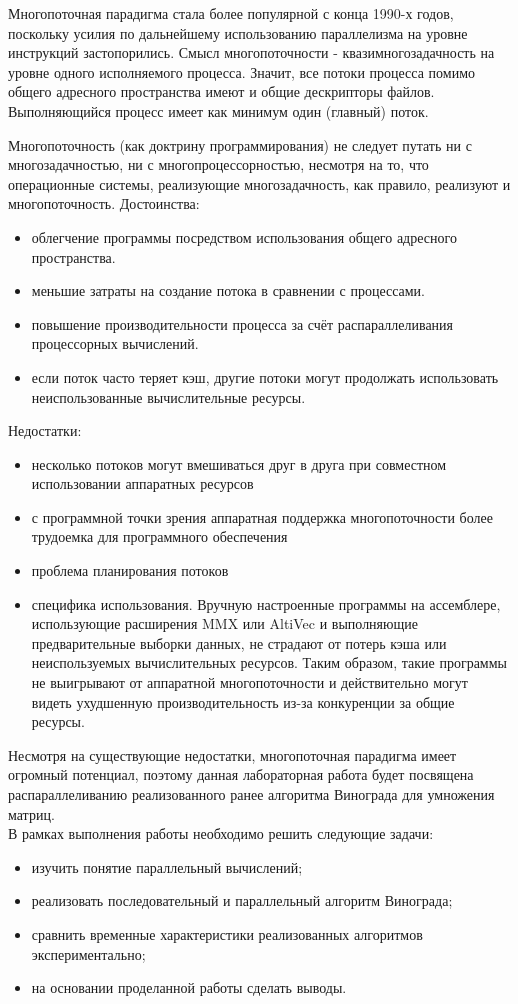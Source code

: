 \documentclass[a4paper,12pt]{article}
\begin{document}
		
Многопоточная парадигма стала более популярной с конца 1990-х годов, поскольку усилия по дальнейшему использованию параллелизма на уровне инструкций застопорились. Смысл многопоточности - квазимногозадачность на уровне одного исполняемого процесса. Значит, все потоки процесса помимо общего адресного пространства имеют и общие дескрипторы файлов. Выполняющийся процесс имеет как минимум один (главный) поток.

Многопоточность (как доктрину программирования) не следует путать ни с многозадачностью, ни с многопроцессорностью, несмотря на то, что операционные системы, реализующие многозадачность, как правило, реализуют и многопоточность.
Достоинства:
\begin{itemize}
    \item облегчение программы посредством использования общего адресного пространства.
    \item меньшие затраты на создание потока в сравнении с процессами.
    \item повышение производительности процесса за счёт распараллеливания процессорных вычислений.
    \item если поток часто теряет кэш, другие потоки могут продолжать использовать неиспользованные вычислительные ресурсы.
\end{itemize}
Недостатки:
\begin{itemize}
    \item несколько потоков могут вмешиваться друг в друга при совместном использовании аппаратных ресурсов
    \item с программной точки зрения аппаратная поддержка многопоточности более трудоемка для программного обеспечения
    \item проблема планирования потоков
    \item специфика использования. Вручную настроенные программы на ассемблере, использующие расширения MMX или AltiVec и выполняющие предварительные выборки данных, не страдают от потерь кэша или неиспользуемых вычислительных ресурсов. Таким образом, такие программы не выигрывают от аппаратной многопоточности и действительно могут видеть ухудшенную производительность из-за конкуренции за общие ресурсы\cite{litlink1}.
\end{itemize}
Несмотря на существующие недостатки, многопоточная парадигма имеет огромный потенциал, поэтому данная лабораторная работа будет посвящена распараллеливанию реализованного ранее алгоритма Винограда для умножения матриц.\\ 		
В рамках выполнения работы необходимо решить следующие задачи:   
		\begin{itemize}
			\item изучить понятие параллельный вычислений;
			\item реализовать последовательный и параллельный алгоритм Винограда;
			\item сравнить временные характеристики реализованных алгоритмов экспериментально; 		
			\item на основании проделанной работы сделать выводы.
		\end{itemize}
    \newpage
\end{document}
